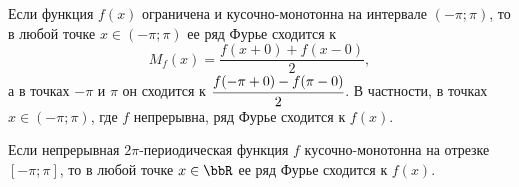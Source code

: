 \begin{cons}
Если функция $f(x)$ ограничена и кусочно-монотонна на интервале $(-\pi;\pi)$, то в любой точке $x \in (-\pi;\pi)$ ее ряд Фурье сходится к
$$
M_f(x) = \frac{f(x+0) + f(x-0)}{2},
$$
а в точках $-\pi$ и $\pi$ он сходится к $\cfrac{f(-\pi+0) - f(\pi-0)}{2}$. В частности, в точках $x \in (-\pi;\pi)$, где $f$ непрерывна, ряд Фурье сходится к $f(x)$.
\end{cons}
\begin{cons}
Если непрерывная $2\pi$-периодическая функция $f$ кусочно-монотонна на отрезке $[-\pi;\pi]$, то в любой точке $x \in \bbR$ ее ряд Фурье сходится к $f(x)$.
\end{cons}
